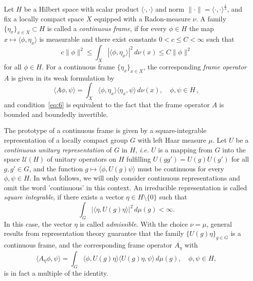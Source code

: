 \documentclass[a4paper,11pt,DIV=11,%
abstract=on%
]{scrartcl}
\newcommand{\red}[1]{#1}
\newcommand{\blue}[1]{#1}
\begin{document}
Let $H$ be a Hilbert space with scalar product $\langle \cdot, \cdot \rangle
$ and norm  $\|\cdot \| = \langle \cdot, \cdot \rangle^\frac12$, and fix
a locally compact space $X$ equipped with a Radon-measure $\nu$. 
A family $\{\eta_x\}_{x\in X}\subset H$ is called a \emph{continuous frame}, 
if for every $ \phi \in H$ the map $x \mapsto \langle \phi , \eta_x \rangle $ is measurable and 
there exist constants $0<\red{c\leq C} < \infty$ such that
\begin{equation}
\red{c}\|\phi \|^2 \leq \int_X |\langle \phi,\eta_x\rangle|^2\,d\nu(x)\leq
\red{C}\|\phi\|^2\label{eq:6}
\end{equation}
for all $\phi\in H$.
For a continuous frame $\{\eta_x\}_{x\in X}$, the corresponding
\emph{frame operator} $A$ is given 
in its weak formulation by
$$\langle A \phi,\psi\rangle 
=
\int_X \langle \phi,\eta_x \rangle \langle \eta_x, \psi\rangle \,d\nu(x), \quad \phi,\psi\in H\,,
$$
and condition~\eqref{eq:6} is equivalent to the fact that the frame
operator $A$ is bounded and boundedly invertible. 

The prototype of \blue{a} continuous frame is given by a square-integrable
representation of a locally compact group $G$ with left Haar measure
$\mu$. Let $U$  be   a \emph{continuous unitary representation} of $G$
in $H$, {\em i.e.}  $U$ is a mapping from 
$G$ into the space $\mathcal U(H)$ of unitary operators on $H$ fulfilling
$U(g g') = U(g) U(g')$ for all $g,g' \in G$, and
the function $g \mapsto \langle \phi, U(g) \psi \rangle$ must be continuous for every $\phi,\psi \in H$.
In what follows, we will only consider continuous representations and
omit the word 'continuous' in this context.  
An irreducible representation  is
called \emph{square integrable}, 
if there exists a vector $\eta \in H \setminus\{0\}$ such that
\begin{equation}\label{eq:admiss_group}
\int_G\bigl|\langle\eta,U(g)\eta\rangle\bigr|^2\,d\mu(g)<\infty.
\end{equation}
In this case, the  vector $\eta$ is called \textit{admissible}.
With the choice $\nu=\mu$, general
results from representation theory
\cite{duflo1976regular} guarantee that
the  family $\{U(g)\eta\}_{g\in G}$ is a
continuous frame, and  the
corresponding frame operator $A_\eta$ with
\begin{equation} \label{frame_op}
\langle A_\eta\phi,\psi\rangle
= 
\int_G\langle\phi,U(g)\eta\rangle\langle U(g)\eta,\psi\rangle\,d\mu(g) , \quad \phi,\psi \in H,
\end{equation}
is in fact  a multiple of the identity.  
\end{document}
